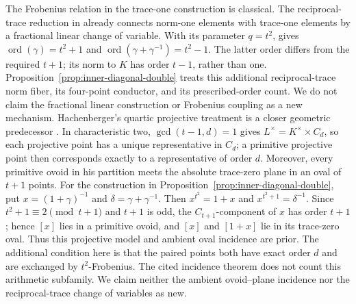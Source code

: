 \documentclass[11pt]{article}
\begin{document}
The Frobenius relation in the trace-one construction is classical.
The reciprocal-trace reduction in \cite[\S4]{Coh} already connects
norm-one elements with trace-one elements by a fractional linear
change of variable. With its parameter $q=t^2$,
\cite[Theorem~1.5]{Coh} gives
$\operatorname{ord}(\gamma)=t^2+1$ and
$\operatorname{ord}(\gamma+\gamma^{-1})=t^2-1$.
The latter order differs from the required $t+1$; its norm
to $K$ has order $t-1$, rather than one.
Proposition~\ref{prop:inner-diagonal-double} treats this
additional reciprocal-trace norm fiber, its four-point conductor,
and its prescribed-order count. We do not claim the fractional
linear construction or Frobenius coupling as a new mechanism.
Hachenberger's quartic projective treatment is a closer geometric
predecessor \cite[Remark~4.2 and Proposition~7.1]{Ha21}.
In characteristic two, $\gcd(t-1,d)=1$ gives
$L^\times=K^\times\times C_d$, so each projective point has a
unique representative in $C_d$; a primitive projective point
then corresponds exactly to a representative of order $d$.
Moreover, every primitive ovoid in his partition meets the
absolute trace-zero plane in an oval of $t+1$ points.
For the construction in Proposition~\ref{prop:inner-diagonal-double},
put $x=(1+\gamma)^{-1}$ and $\delta=\gamma+\gamma^{-1}$.
Then $x^{t^2}=1+x$ and $x^{t^2+1}=\delta^{-1}$. Since
$t^2+1\equiv2\pmod{t+1}$ and $t+1$ is odd, the
$C_{t+1}$-component of $x$ has order $t+1$; hence $[x]$ lies in a
primitive ovoid, and $[x]$ and $[1+x]$ lie in its trace-zero
oval. Thus this projective model and ambient oval incidence are
prior. The additional condition here is that the paired points
both have exact order $d$ and are exchanged by $t^2$-Frobenius.
The cited incidence theorem does not count this arithmetic
subfamily. We claim neither the ambient ovoid--plane incidence
nor the reciprocal-trace change of variables as new.
\end{document}
